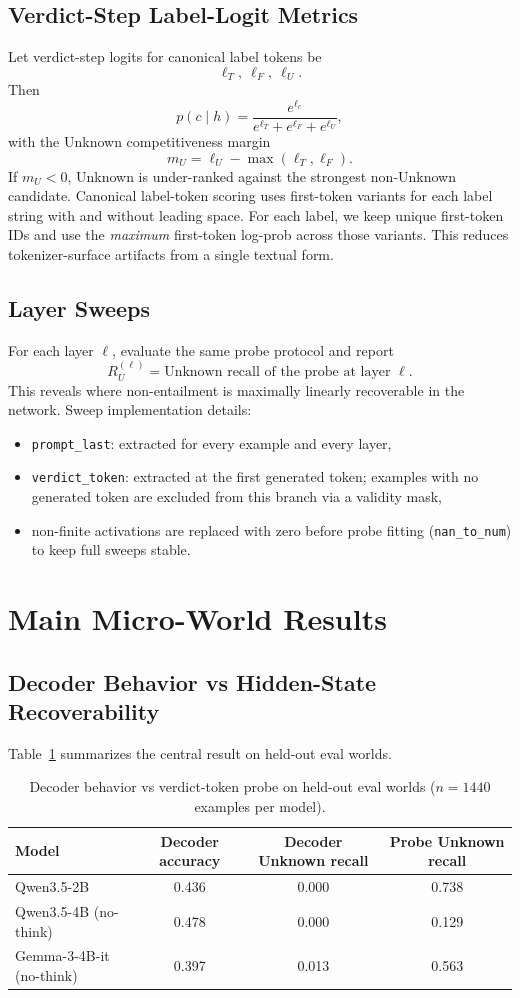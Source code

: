 \documentclass[11pt]{article}
\begin{document}
\subsection{Verdict-Step Label-Logit Metrics}
Let verdict-step logits for canonical label tokens be
\[
\ell_T,\ \ell_F,\ \ell_U.
\]
Then
\[
p(c \mid h) = \frac{e^{\ell_c}}{e^{\ell_T}+e^{\ell_F}+e^{\ell_U}},
\]
with the Unknown competitiveness margin
\[
m_U = \ell_U - \max(\ell_T,\ell_F).
\]
If \(m_U < 0\), Unknown is under-ranked against the strongest non-Unknown candidate.
Canonical label-token scoring uses first-token variants for each label string with and without leading space.
For each label, we keep unique first-token IDs and use the \emph{maximum} first-token log-prob across those variants.
This reduces tokenizer-surface artifacts from a single textual form.

\subsection{Layer Sweeps}
For each layer \(\ell\), evaluate the same probe protocol and report
\[
R_U^{(\ell)} = \text{Unknown recall of the probe at layer }\ell.
\]
This reveals where non-entailment is maximally linearly recoverable in the network.
Sweep implementation details:
\begin{itemize}
  \item \texttt{prompt\_last}: extracted for every example and every layer,
  \item \texttt{verdict\_token}: extracted at the first generated token; examples with no generated token are excluded from this branch via a validity mask,
  \item non-finite activations are replaced with zero before probe fitting (\texttt{nan\_to\_num}) to keep full sweeps stable.
\end{itemize}

\section{Main Micro-World Results}
\subsection{Decoder Behavior vs Hidden-State Recoverability}
Table~\ref{tab:decoderprobe} summarizes the central result on held-out eval worlds.

\begin{table}[H]
\centering
\caption{Decoder behavior vs verdict-token probe on held-out eval worlds (\(n=1440\) examples per model).}
\label{tab:decoderprobe}
\begin{tabular}{lccc}
\toprule
Model & Decoder accuracy & Decoder Unknown recall & Probe Unknown recall \\
\midrule
Qwen3.5-2B & 0.436 & 0.000 & 0.738 \\
Qwen3.5-4B (no-think) & 0.478 & 0.000 & 0.129 \\
Gemma-3-4B-it (no-think) & 0.397 & 0.013 & 0.563 \\
\bottomrule
\end{tabular}
\end{table}
\end{document}
